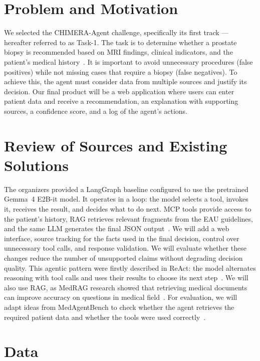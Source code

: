 \documentclass[english]{ucuproposal}
\begin{document}
\maketitlepage

\section{Problem and Motivation}

We selected the CHIMERA-Agent challenge, specifically its first track --- hereafter referred to as Task-1. The task is to determine whether a prostate biopsy is recommended based on MRI findings, clinical indicators, and the patient's medical history~\cite{chimeraTask1}. It is important to avoid unnecessary procedures (false positives) while not missing cases that require a biopsy (false negatives). To achieve this, the agent must consider data from multiple sources and justify its decision. Our final product will be a web application where users can enter patient data and receive a recommendation, an explanation with supporting sources, a confidence score, and a log of the agent's actions.

\section{Review of Sources and Existing Solutions}

The organizers provided a LangGraph baseline configured to use the pretrained Gemma~4 E2B-it model. It operates in a loop: the model selects a tool, invokes it, receives the result, and decides what to do next. MCP tools provide access to the patient's history, RAG retrieves relevant fragments from the EAU guidelines, and the same LLM generates the final JSON output~\cite{chimeraBaselineCode}. We will add a web interface, source tracking for the facts used in the final decision, control over unnecessary tool calls, and response validation. We will evaluate whether these changes reduce the number of unsupported claims without degrading decision quality.
This agentic pattern were firstly described in ReAct: the model alternates reasoning with tool calls and uses their results to choose its next step~\cite{yao2023react}. We will also use RAG, as MedRAG research showed that retrieving medical documents can improve accuracy on questions in medical field~\cite{xiong2024medrag}. For evaluation, we will adapt ideas from MedAgentBench to check whether the agent retrieves the required patient data and whether the tools were used correctly~\cite{jiang2025medagentbench}.

\section{Data}
\end{document}
